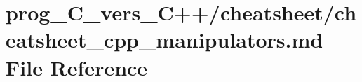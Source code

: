 \hypertarget{prog__C__vers__C_09_09_2cheatsheet_2cheatsheet__cpp__manipulators_8md}{}\section{prog\+\_\+\+C\+\_\+vers\+\_\+\+C++/cheatsheet/cheatsheet\+\_\+cpp\+\_\+manipulators.md File Reference}
\label{prog__C__vers__C_09_09_2cheatsheet_2cheatsheet__cpp__manipulators_8md}
